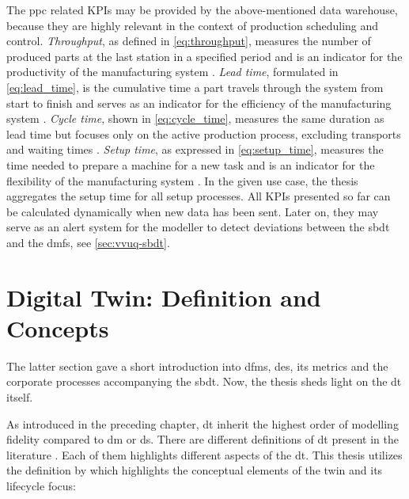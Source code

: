 The \gls{ppc} related KPIs may be provided by the above-mentioned data warehouse, because they are highly relevant in the context of production scheduling and control. \textit{Throughput}, as defined in \autoref{eq:throughput}, measures the number of produced parts at the last station in a specified period and is an indicator for the productivity of the manufacturing system \autocite{hopp2011factory, imseitif2019throughput}. \textit{Lead time}, formulated in \autoref{eq:lead_time}, is the cumulative time a part travels through the system from start to finish and serves as an indicator for the efficiency of the manufacturing system \autocite{slack2010operations, pfeiffer2016manufacturing}. \textit{Cycle time}, shown in \autoref{eq:cycle_time}, measures the same duration as lead time but focuses only on the active production process, excluding transports and waiting times \autocite{goldratt2004goal, griffin1993metrics}. \textit{Setup time}, as expressed in \autoref{eq:setup_time}, measures the time needed to prepare a machine for a new task and is an indicator for the flexibility of the manufacturing system \autocite{allahverdi1999review, allahverdi2008significance}. In the given use case, the thesis aggregates the setup time for all setup processes. All KPIs presented so far can be calculated dynamically when new data has been sent. Later on, they may serve as an alert system for the modeller to detect deviations between the \gls{sbdt} and the \gls{dmfs}, see \autoref{sec:vvuq-sbdt}.

\section{Digital Twin: Definition and Concepts}
\label{sec:digital-twin}
The latter section gave a short introduction into \gls{dfms}, \gls{des}, its metrics and the corporate processes accompanying the \gls{sbdt}. Now, the thesis sheds light on the \gls{dt} itself.

As introduced in the preceding chapter, \gls{dt} inherit the highest order of modelling fidelity compared to \gls{dm} or \gls{ds}. There are different definitions of \gls{dt} present in the literature \autocite{Negri2017promfg,zheng2019application,glaessgen2012digital,Demkovich2018def,boschert2016digital,grieves2014digital,kritzinger2018digital,Tao2018ijamt,zehnder2018representing}. Each of them highlights different aspects of the \gls{dt}. This thesis utilizes the definition by \textcite{grieves2014digital} which highlights the conceptual elements of the twin and its lifecycle focus:

